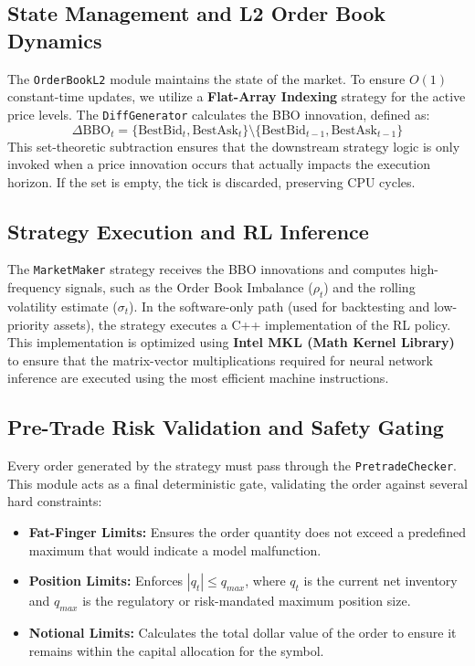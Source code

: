 \subsection{State Management and L2 Order Book Dynamics}
The \texttt{OrderBookL2} module maintains the state of the market. To ensure $O(1)$ constant-time updates, we utilize a \textbf{Flat-Array Indexing} strategy for the active price levels. The \texttt{DiffGenerator} calculates the BBO innovation, defined as:
\begin{equation}
    \Delta \text{BBO}_t = \{ \text{BestBid}_t, \text{BestAsk}_t \} \setminus \{ \text{BestBid}_{t-1}, \text{BestAsk}_{t-1} \}
\end{equation}
This set-theoretic subtraction ensures that the downstream strategy logic is only invoked when a price innovation occurs that actually impacts the execution horizon. If the set is empty, the tick is discarded, preserving CPU cycles.

\subsection{Strategy Execution and RL Inference}
The \texttt{MarketMaker} strategy receives the BBO innovations and computes high-frequency signals, such as the Order Book Imbalance ($\rho_t$) and the rolling volatility estimate ($\sigma_t$). In the software-only path (used for backtesting and low-priority assets), the strategy executes a C++ implementation of the RL policy. This implementation is optimized using \textbf{Intel MKL (Math Kernel Library)} to ensure that the matrix-vector multiplications required for neural network inference are executed using the most efficient machine instructions.

\subsection{Pre-Trade Risk Validation and Safety Gating}
Every order generated by the strategy must pass through the \texttt{PretradeChecker}. This module acts as a final deterministic gate, validating the order against several hard constraints:
\begin{itemize}
    \item \textbf{Fat-Finger Limits:} Ensures the order quantity does not exceed a predefined maximum that would indicate a model malfunction.
    \item \textbf{Position Limits:} Enforces $|q_t| \leq q_{max}$, where $q_t$ is the current net inventory and $q_{max}$ is the regulatory or risk-mandated maximum position size.
    \item \textbf{Notional Limits:} Calculates the total dollar value of the order to ensure it remains within the capital allocation for the symbol.
\end{itemize}

